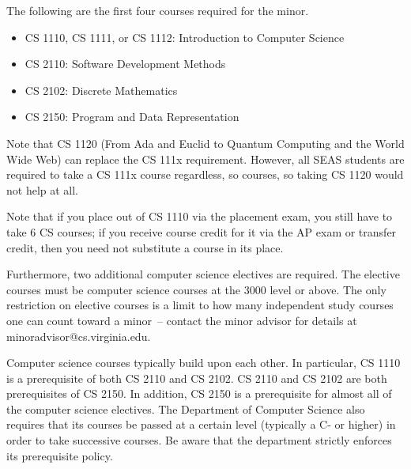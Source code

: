 \documentclass[10pt,letter]{book}
\makeatletter
\newenvironment{itemlist}{
\begin{itemize}
\setlength{\itemsep}{0pt}
\setlength{\parskip}{0pt}}
{\end{itemize}}
\newcommand{\csminoradvisoremail}{minoradvisor@cs.virginia.edu}
\makeatother
\begin{document}
The following are the first four courses required for the minor.

\begin{itemlist} 
\item CS 1110, CS 1111, or CS 1112: Introduction
  to Computer Science
\item CS 2110: Software Development Methods
\item CS 2102: Discrete Mathematics
\item CS 2150: Program and Data Representation
\end{itemlist}

Note that CS 1120 (From Ada and Euclid to Quantum Computing and the
World Wide Web) can replace the CS 111x requirement.  However, all
SEAS students are required to take a CS 111x course regardless, so
courses, so taking CS 1120 would not help at all.

Note that if you place out of CS 1110 via the placement exam,
you still have to take 6 CS courses; if you receive course credit for
it via the AP exam or transfer credit, then you need not substitute a
course in its place.

Furthermore, two additional computer science electives are
required. The elective courses must be computer science courses at the
3000 level or above. The only restriction on elective courses is a
limit to how many independent study courses one can count toward a
minor~-- contact the minor advisor for details at
\csminoradvisoremail.

Computer science courses typically build upon each other. In
particular, CS 1110 is a prerequisite of both CS 2110 and
CS 2102. CS 2110 and CS 2102 are both prerequisites
of CS 2150. In addition, CS 2150 is a prerequisite for
almost all of the computer science electives. The Department of
Computer Science also requires that its courses be passed at a certain
level (typically a C- or higher) in order to take successive
courses. Be aware that the department strictly enforces its
prerequisite policy.
\end{document}
